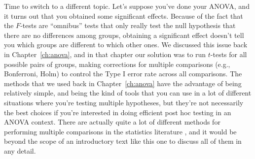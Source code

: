 Time to switch to a different topic. Let's suppose you've done your ANOVA, and it turns out that you obtained some significant effects. Because of the fact that the $F$-tests are ``omnibus'' tests that only really test the null hypothesis that there are no differences among groups, obtaining a significant effect doesn't tell you which groups are different to which other ones. We discussed this issue back in Chapter~\ref{ch:anova}, and in that chapter our solution was to run $t$-tests for all possible pairs of groups, making  corrections for multiple comparisons (e.g., Bonferroni, Holm) to control the Type I error rate across all comparisons. The methods that we used back in Chapter~\ref{ch:anova} have the advantage of being relatively simple, and being the kind of tools that you can use in a lot of different situations where you're testing multiple hypotheses, but they're not necessarily the best choices if you're interested in doing efficient post hoc testing in an ANOVA context. There are actually quite a lot of different methods for performing multiple comparisons in the statistics literature \cite{Hsu1996}, and it would be beyond the scope of an introductory text like this one to discuss all of them in any detail. 

